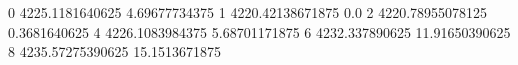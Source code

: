 0 4225.1181640625 4.69677734375
1 4220.42138671875 0.0
2 4220.78955078125 0.3681640625
4 4226.1083984375 5.68701171875
6 4232.337890625 11.91650390625
8 4235.57275390625 15.1513671875
